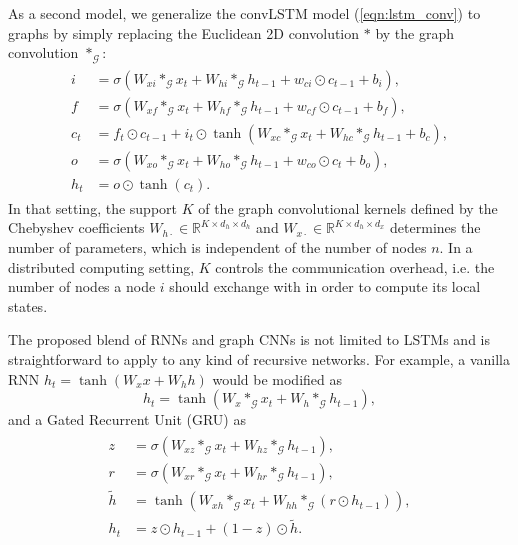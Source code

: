 \documentclass{article} %
\newcommand{\R}{\mathbb{R}}
\newcommand{\G}{\mathcal{G}}
\newcommand{\eqnref}[1]{(\ref{eqn:#1})}
\begin{document}
As a second model, we generalize the convLSTM model \eqnref{lstm_conv} to graphs by simply 
replacing the Euclidean 2D convolution $\ast$ by the graph convolution
$\ast_\G$:
\begin{align} \label{eqn:lstm_graph_v2}
\begin{split}
	i &= \sigma(W_{xi} \ast_\G x_t + W_{hi} \ast_\G h_{t-1} +
	            w_{ci} \odot c_{t-1} + b_i), \\
	f &= \sigma(W_{xf} \ast_\G x_t + W_{hf} \ast_\G h_{t-1} +
	            w_{cf} \odot c_{t-1} + b_f), \\
	c_t &= f_t \odot c_{t-1} + i_t \odot
	       \tanh(W_{xc} \ast_\G x_t + W_{hc} \ast_\G h_{t-1} + b_c), \\
	o &= \sigma(W_{xo} \ast_\G x_t + W_{ho} \ast_\G h_{t-1} +
	            w_{co} \odot c_t + b_o), \\
	h_t &= o \odot \tanh(c_t).
\end{split}
\end{align}
In that setting, the support $K$ of the graph
convolutional kernels defined by the Chebyshev coefficients $W_{h\cdot} \in
\R^{K \times d_h \times d_h}$ and $W_{x\cdot} \in \R^{K \times d_h \times d_x}$
determines the number of parameters, which is independent of the number of
nodes $n$. In a distributed computing setting, $K$ controls the communication
overhead, i.e. the number of nodes a node $i$ should exchange with in order to
compute its local states.

The proposed blend of RNNs and graph CNNs is not limited to LSTMs and is
straightforward to apply to any kind of recursive networks. For example, a
vanilla RNN $h_t = \tanh(W_x x + W_h h)$ would be modified as
\begin{equation} \label{eqn:vrnn_graph}
	h_t = \tanh(W_x \ast_\G x_t + W_h \ast_\G h_{t-1}),
\end{equation}
and a Gated Recurrent Unit (GRU) \citep{gru} as
\begin{align} \label{eqn:gru_graph}
\begin{split}
	z &= \sigma(W_{xz} \ast_\G x_t + W_{hz} \ast_\G h_{t-1}), \\
	r &= \sigma(W_{xr} \ast_\G x_t + W_{hr} \ast_\G h_{t-1}), \\
	\tilde{h} &= \tanh(W_{xh} \ast_\G x_t + W_{hh} \ast_\G (r \odot h_{t-1})), \\
	h_t &= z \odot h_{t-1} + (1-z) \odot \tilde{h}.
\end{split}
\end{align}
\end{document}

